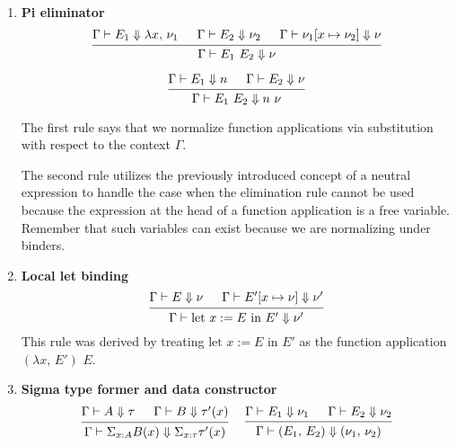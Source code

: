 \documentclass{article}
\begin{document}
\begin{enumerate}
\item \textbf{Pi eliminator} \\
  \[
    \begin{prooftree}
      \hypo{\Gamma \vdash E_1 \Downarrow \lambda x, \, \nu_1}
      \hypo{\Gamma \vdash E_2 \Downarrow \nu_2}
      \hypo{\Gamma \vdash \nu_1[x \mapsto \nu_2] \Downarrow \nu}
      \infer3{\Gamma \vdash E_1 \,\, E_2 \Downarrow \nu}
    \end{prooftree}
  \]

  \[
    \begin{prooftree}
      \hypo{\Gamma \vdash E_1 \Downarrow n}
      \hypo{\Gamma \vdash E_2 \Downarrow \nu}
      \infer2{\Gamma \vdash E_1 \,\, E_2 \Downarrow n \,\, \nu}
    \end{prooftree}
  \]

  The first rule says that we normalize function applications via
  substitution with respect to the context $\Gamma$.

  The second rule utilizes the previously introduced concept of a neutral
  expression to handle the case when the elimination rule cannot be used because
  the expression at the head of a function application is a free variable.
  Remember that such variables can exist because we are normalizing under
  binders.

\item \textbf{Local let binding} \\
    \[
      \begin{prooftree}
        \hypo{\Gamma \vdash E \Downarrow \nu}
        \hypo{\Gamma \vdash E'[x \mapsto \nu] \Downarrow \nu'}
        \infer2{\Gamma \vdash \text{let } x := E \text{ in } E' \Downarrow \nu'}
      \end{prooftree}
    \]
    This rule was derived by treating $\text{let } x := E \text{ in } E'$ as
    the function application $(\lambda x, \, E') \,\, E$.

\item \textbf{Sigma type former and data constructor} \\
    \begin{gather*}
      \begin{prooftree}
        \hypo{\Gamma \vdash A \Downarrow \tau}
        \hypo{\Gamma \vdash B \Downarrow \tau'(x)}
        \infer2{\Gamma \vdash \Sigma_{x : A}B(x) \Downarrow \Sigma_{x : \tau}\tau'(x)}
      \end{prooftree}
      ~ \quad
      \begin{prooftree}
        \hypo{\Gamma \vdash E_1 \Downarrow \nu_1}
        \hypo{\Gamma \vdash E_2 \Downarrow \nu_2}
        \infer2{\Gamma \vdash (E_1, \, E_2) \Downarrow (\nu_1, \, \nu_2)}
      \end{prooftree}
    \end{gather*}


\end{enumerate}
\end{document}
